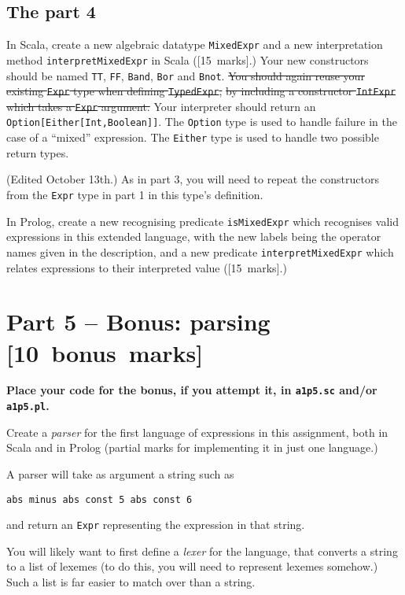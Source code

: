 \documentclass[11pt]{article}
\begin{document}
\subsection*{The part 4}
\label{sec:org8b71578}
In Scala, create a new algebraic datatype \texttt{MixedExpr} and a new
interpretation method \texttt{interpretMixedExpr} in Scala ([15 marks].)
Your new constructors should be named \texttt{TT}, \texttt{FF}, \texttt{Band}, \texttt{Bor} and \texttt{Bnot}.
\sout{You should again reuse your existing \texttt{Expr} type when defining \texttt{TypedExpr},}
\sout{by including a constructor \texttt{IntExpr} which takes a \texttt{Expr} argument.}
Your interpreter should return an \texttt{Option[Either[Int,Boolean]]}.
The \texttt{Option} type is used to handle failure in the case
of a “mixed” expression.
The \texttt{Either} type is used to handle two possible return types.

(Edited October 13th.)
As in part 3, you will need to repeat the constructors from the
\texttt{Expr} type in part 1 in this type's definition.

In Prolog, create a new recognising predicate \texttt{isMixedExpr} which
recognises valid expressions in this extended language,
with the new labels being the operator names given in the description,
and a new predicate \texttt{interpretMixedExpr} which relates
expressions to their interpreted value ([15 marks].)

\section*{Part 5 – Bonus: parsing                [10 bonus marks]}
\label{sec:org89c84f8}
\begin{center}
\textbf{Place your code for the bonus, if you attempt it, in \texttt{a1p5.sc} and/or \texttt{a1p5.pl}.}
\end{center}

Create a \emph{parser} for the first language of expressions
in this assignment, both in Scala and in Prolog
(partial marks for implementing it in just one language.)

A parser will take as argument a string such as
\begin{verbatim}
abs minus abs const 5 abs const 6
\end{verbatim}
and return an \texttt{Expr} representing the expression in that string.

You will likely want to first define a \emph{lexer} for the language,
that converts a string to a list of lexemes
(to do this, you will need to represent lexemes somehow.)
Such a list is far easier to match over than a string.
\end{document}
